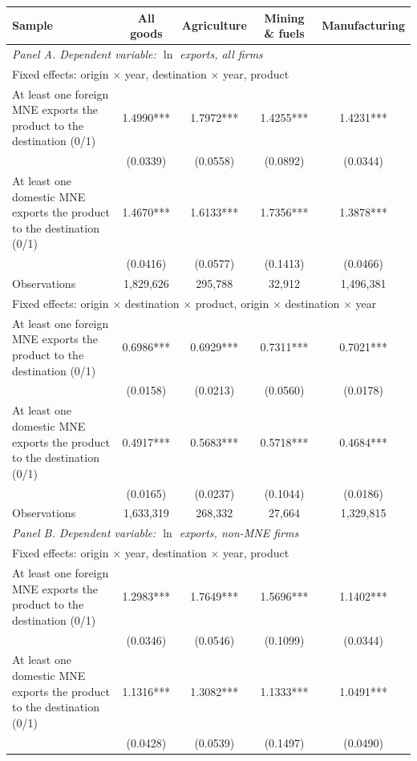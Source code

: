 \begin{tabular}{lcccc} \hline
Sample & All goods & Agriculture & Mining \& fuels & Manufacturing \\ \hline
\multicolumn{5}{l}{\textit{Panel A. Dependent variable: $\ln$ exports, all firms}} \\
\multicolumn{5}{l}{\footnotesize Fixed effects: origin $\times$ year, destination $\times$ year, product} \\
\quad At least one foreign MNE exports the product to the destination (0/1) & 1.4990*** & 1.7972*** & 1.4255*** & 1.4231*** \\
 & (0.0339) & (0.0558) & (0.0892) & (0.0344) \\
\quad At least one domestic MNE exports the product to the destination (0/1) & 1.4670*** & 1.6133*** & 1.7356*** & 1.3878*** \\
 & (0.0416) & (0.0577) & (0.1413) & (0.0466) \\
\quad Observations & 1,829,626 & 295,788 & 32,912 & 1,496,381 \\
\multicolumn{5}{l}{\footnotesize Fixed effects: origin $\times$ destination $\times$ product, origin $\times$ destination $\times$ year} \\
\quad At least one foreign MNE exports the product to the destination (0/1) & 0.6986*** & 0.6929*** & 0.7311*** & 0.7021*** \\
 & (0.0158) & (0.0213) & (0.0560) & (0.0178) \\
\quad At least one domestic MNE exports the product to the destination (0/1) & 0.4917*** & 0.5683*** & 0.5718*** & 0.4684*** \\
 & (0.0165) & (0.0237) & (0.1044) & (0.0186) \\
\quad Observations & 1,633,319 & 268,332 & 27,664 & 1,329,815 \\
\midrule
\multicolumn{5}{l}{\textit{Panel B. Dependent variable: $\ln$ exports, non-MNE firms}} \\
\multicolumn{5}{l}{\footnotesize Fixed effects: origin $\times$ year, destination $\times$ year, product} \\
\quad At least one foreign MNE exports the product to the destination (0/1) & 1.2983*** & 1.7649*** & 1.5696*** & 1.1402*** \\
 & (0.0346) & (0.0546) & (0.1099) & (0.0344) \\
\quad At least one domestic MNE exports the product to the destination (0/1) & 1.1316*** & 1.3082*** & 1.1333*** & 1.0491*** \\
 & (0.0428) & (0.0539) & (0.1497) & (0.0490) \\

\end{tabular}

